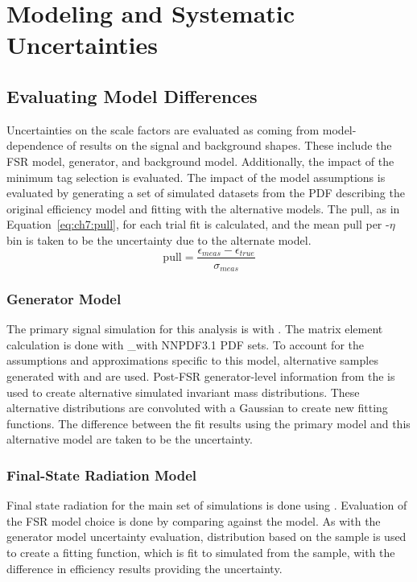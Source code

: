 \section{Modeling and Systematic Uncertainties}\label{ch:eff:systematics}
\subsection{Evaluating Model Differences}
Uncertainties on the scale factors are evaluated as coming from model-dependence of results on the signal and background shapes. These include the FSR model, generator, and background model. Additionally, the impact of the minimum tag selection \pt is evaluated. 
The impact of the model assumptions is evaluated by generating a set of simulated datasets from the PDF describing the original efficiency model and fitting with the alternative models. The pull, as in Equation~\ref{eq:ch7:pull}, for each trial fit is calculated, and the mean pull per \pt-$\eta$ bin is taken to be the uncertainty due to the alternate model. 
\begin{equation}
\mathrm{pull}=\frac{\epsilon_{meas}-\epsilon_{true}}{\sigma_{meas}}
    \label{eq:ch7:pull}
\end{equation}

\subsubsection{Generator Model}
The primary signal simulation for this analysis is \aMCATNLO with . The matrix element calculation is done with \_\aMCATNLO with NNPDF3.1 PDF sets. To account for the assumptions and approximations specific to this model, alternative samples generated with \POWHEG and  are used. Post-FSR generator-level information from the \POWHEG is used to create alternative simulated invariant mass distributions. These alternative \mll distributions are convoluted with a Gaussian to create new fitting functions. The difference between the fit results using the primary model and this alternative model are taken to be the uncertainty. 

\subsubsection{Final-State Radiation Model}
Final state radiation for the main set of simulations is done using . Evaluation of the FSR model choice is done by comparing \PYTHIA against the \PHOTOS model. As with the generator model uncertainty evaluation, \mll distribution based on the \PHOTOS sample is used to create a fitting function, which is fit to simulated \mll from the \PYTHIA sample, with the difference in efficiency results providing the uncertainty.

